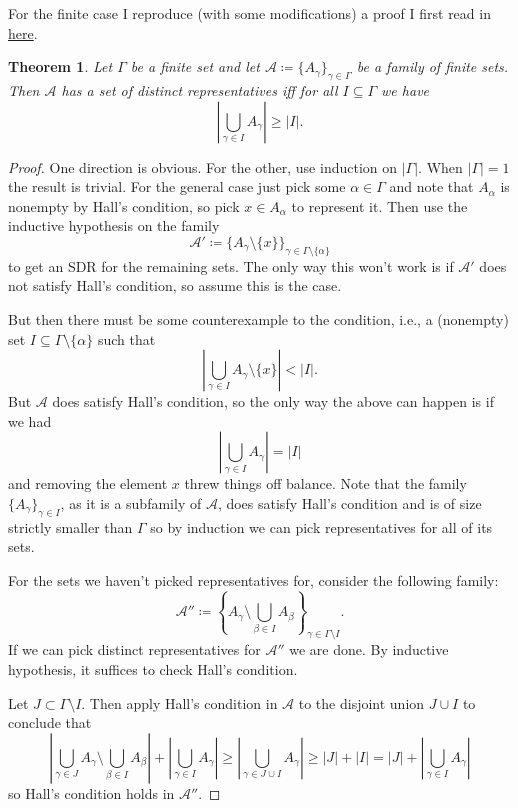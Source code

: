 \documentclass{article}
\theoremstyle{definition}
\theoremstyle{plain}
\newtheorem{thm}{Theorem}
\theoremstyle{definition}
\begin{document}
	For the finite case I reproduce (with some modifications) a proof I first read in \href{https://homes.cs.washington.edu/~anuprao/pubs/CSE599sExtremal/lecture6.pdf}{here}.
	\begin{thm}\label{thm:hall_finite}
		Let $\Gamma$ be a finite set and let $\mathcal{A} \coloneqq \{A_\gamma\}_{\gamma\in\Gamma}$ be a family of finite sets. Then $\mathcal{A}$ has a set of distinct representatives iff for all $I\subseteq \Gamma$ we have
		\[
		\left|\bigcup_{\gamma\in I} A_\gamma\right| \geq |I|.
		\] 
	\end{thm}
	\begin{proof}
		One direction is obvious. For the other, use induction on $|\Gamma|$. When $|\Gamma| = 1$ the result is trivial. For the general case just pick some $\alpha \in \Gamma$ and note that $A_{\alpha}$ is nonempty by Hall's condition, so pick $x \in A_{\alpha}$ to represent it. Then use the inductive hypothesis on the family
		\[
			\mathcal{A}' \coloneqq \{A_{\gamma}\setminus\{x\}\}_{\gamma\in\Gamma\setminus\{\alpha\}}
		\]
		to get an SDR for the remaining sets. The only way this won't work is if $\mathcal{A}'$ does not satisfy Hall's condition, so assume this is the case.
		
		But then there must be some counterexample to the condition, i.e., a (nonempty) set $I\subseteq \Gamma \setminus\{\alpha\}$ such that 
		\[
			\left|\bigcup_{\gamma \in I} A_{\gamma}\setminus\{x\}\right| < |I|.
		\]
		But $\mathcal{A}$ does satisfy Hall's condition, so the only way the above can happen is if we had
		\[
			\left|\bigcup_{\gamma \in I}A_\gamma\right| = |I|
		\]
		and removing the element $x$ threw things off balance. Note that the family $\{A_{\gamma}\}_{\gamma \in I}$, as it is a subfamily of $\mathcal{A}$, does satisfy Hall's condition and is of size strictly smaller than $\Gamma$ so by induction we can pick representatives for all of its sets.
		
		For the sets we haven't picked representatives for, consider the following family:
		\[
			\mathcal{A}'' \coloneqq \left\{A_{\gamma}\setminus\bigcup_{\beta \in I}A_\beta\right\}_{\gamma \in \Gamma\setminus I}.
		\]
		If we can pick distinct representatives for $\mathcal{A}''$ we are done. By inductive hypothesis, it suffices to check Hall's condition.
		
		Let $J \subset \Gamma\setminus I$. Then apply Hall's condition in $\mathcal{A}$ to the disjoint union $J\cup I$ to conclude that 
		\[
			\left|\bigcup_{{\gamma \in J}} A_\gamma \setminus \bigcup_{\beta \in I}A_\beta \right| + \left|\bigcup_{\gamma \in I} A_{\gamma}\right| \geq  \left|\bigcup_{\gamma \in J\cup I} A_\gamma\right| \geq |J| + |I| = |J| + \left|\bigcup_{\gamma \in I} A_\gamma \right|
		\]
		so Hall's condition holds in $\mathcal{A}''$.
	\end{proof}
\end{document}
